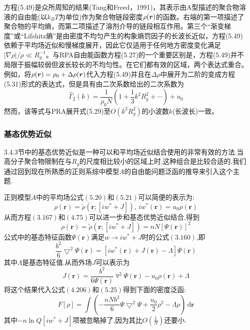 方程(5.49)是众所周知的结果(Tang和Freed，1991)，其表示由A型描述的聚合物溶液的自由能(以$k_BT$为单位)作为聚合物链段密度$\rho(\bm{r})$的函数。右端的第一项描述了聚合物的平均熵，而第二项描述了溶剂介导的链段相互作用。第三个“渐变梯度”或“Lifshitz熵”是由密度不均匀产生的构象熵罚因子的长波长近似，方程(5.49)依赖于平均场近似和慢梯度展开，因此它仅适用于任何地方密度变化满足$\left|\nabla\rho\right|/\rho\ll R_g^{-1}$。与RPA自由能函数方程(5.27)的一个重要区别是，方程(5.49)并不局限于振幅较弱但波长较长的不均匀性。在它们都有效的区域，两个表达式重合。例如，将$\rho(\bm{r})=\rho_0+\Delta\rho(\bm{r})$代入方程(5.49)并且在$\Delta\rho$中展开为二阶的变成方程(5.31)形式的表达式，但是具有由二次系数给出的二次系数为
\begin{equation}
\hat{\Gamma}_2(k)=\frac{1}{\rho_0N}\left(1+\frac{1}{3}k^2R_g^2+\cdots\right)+u_0
\end{equation}
然而，该等式与PRA展开式(5.29)至$O(k^2R_g^2)$的小波数$k$(长波长)一致。

\subsubsection{基态优势近似}
3.4.3节中的基态优势近似是一种可以和平均场近似结合使用的非常有效的方法.当高分子聚合物限制在与$R_g$的尺度相比较小的区域上时,这种组合是比较合适的.我们通过回到现在所熟悉的正则系综中模型$A$的自由能问题泛函的推导来引入这个主题.

正则模型$A$中的平均场公式$(5.20)$和$(5.21)$可以简便的表示为:
\begin{equation}
\rho(\mathbf{r}) = \tilde{\rho}(\mathbf{r};[iw^*+J]),\,iw^*(\mathbf{r}) = u_0 \rho(\mathbf{r})
\end{equation}
从而方程$(3.167)$和$(4.75)$可以进一步和基态优势近似结合,得到
\begin{equation}
\rho(\mathbf{r}) = \tilde{\rho}(\mathbf{r};[iw^*+J]) = nN[\Psi(\mathbf{r})]^2
\end{equation}
公式中的基态特征函数$\Psi(\mathbf{r})$满足$w \rightarrow iw^*+J$时的公式$(3.160)$,即
\begin{equation}
\frac{b^2}{6} {\bigtriangledown}^2 \Psi(\mathbf{r}) = [iw^*(\mathbf{r})+J(\mathbf{r})-\Lambda]\Psi(\mathbf{r})
\end{equation}
其中$\Lambda$是基态特征值.从而外场$J$可以表示为
\begin{equation}
J(\mathbf{r}) = \frac{b^2}{6 \Psi(\mathbf{r})} \triangledown^2 \Psi(\mathbf{r}) - u_0 \rho(\mathbf{r}) + \Lambda
\end{equation}
将这个结果代入公式$(4.206)$和$(5.25)$得到下面的密度泛函:
\begin{equation}
F[\rho] = \int (-\frac{nNb^2}{6}\Psi\bigtriangledown^2\Psi+\frac{u_0}{2}\rho^2-\Lambda\rho)\,\mathrm{d}\mathbf{r}
\end{equation}
其中$-n\ln Q[iw^*+J]$项被忽略掉了,因为其比$O(\frac{1}{N})$还要小.

